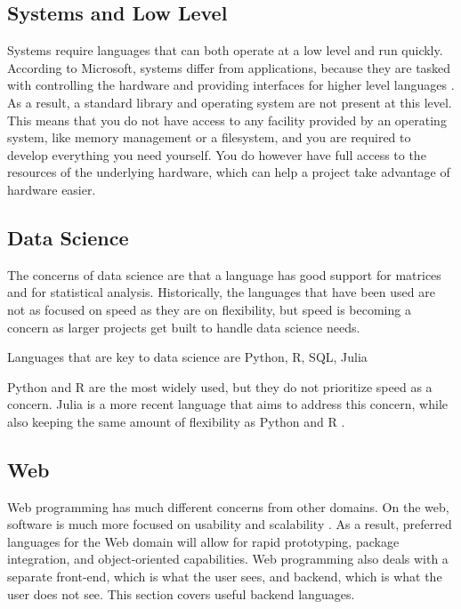 \documentclass[12pt, oneside, a4paper]{book}
\begin{document}
         \subsection{Systems and Low Level}
         Systems require languages that can both operate at a low level and run quickly.
         According to Microsoft, systems differ from applications, because they are tasked with controlling the hardware and providing interfaces for higher level languages \autocite{microsoftPanelSystemsProgramming2014}.
         As a result, a standard library and operating system are not present at this level.
         This means that you do not have access to any facility provided by an operating system, like memory management or a filesystem, and you are required to develop everything you need yourself.
         You do however have full access to the resources of the underlying hardware, which can help a project take advantage of hardware easier.

         \subsection{Data Science}
         The concerns of data science are that a language has good support for matrices and for statistical analysis.
         Historically, the languages that have been used are not as focused on speed as they are on flexibility, but speed is becoming a concern as larger projects get built to handle data science needs.

         Languages that are key to data science are Python, R, SQL, Julia \autocite{MostPopularLanguages}

         Python and R are the most widely used, but they do not prioritize speed as a concern.
         Julia is a more recent language that aims to address this concern, while also keeping the same amount of flexibility as Python and R \autocite{MostPopularLanguages}.

         \subsection{Web}
         Web programming has much different concerns from other domains.
         On the web, software is much more focused on usability and scalability \autocite{siiaSoftwareServiceChanging2004}.
         As a result, preferred languages for the Web domain will allow for rapid prototyping, package integration, and object-oriented capabilities.
         Web programming also deals with a separate front-end, which is what the user sees, and backend, which is what the user does not see.
         This section covers useful backend languages.
\end{document}
